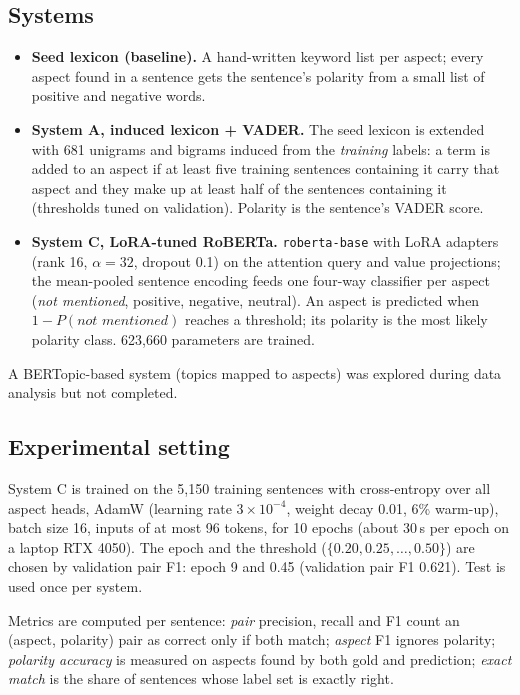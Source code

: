 \documentclass[11pt,a4paper]{article}
\begin{document}
\subsection{Systems}

\begin{itemize}
  \item \textbf{Seed lexicon (baseline).} A hand-written keyword list per aspect; every aspect
    found in a sentence gets the sentence's polarity from a small list of positive and negative
    words.
  \item \textbf{System A, induced lexicon + VADER.} The seed lexicon is extended with 681
    unigrams and bigrams induced from the \emph{training} labels: a term is added to an aspect
    if at least five training sentences containing it carry that aspect and they make up at
    least half of the sentences containing it (thresholds tuned on validation). Polarity is the
    sentence's VADER score.
  \item \textbf{System C, LoRA-tuned RoBERTa.} \texttt{roberta-base} with LoRA adapters
    \citep{hu2022lora} (rank 16, $\alpha=32$, dropout 0.1) on the attention query and value
    projections; the mean-pooled sentence encoding feeds one four-way classifier per aspect
    (\emph{not mentioned}, positive, negative, neutral). An aspect is predicted when
    $1-P(\textit{not mentioned})$ reaches a threshold; its polarity is the most likely polarity
    class. 623,660 parameters are trained.
\end{itemize}

A BERTopic-based system (topics mapped to aspects) was explored during data analysis but not
completed.

\subsection{Experimental setting}

System C is trained on the 5,150 training sentences with cross-entropy over all aspect heads,
AdamW (learning rate $3\times10^{-4}$, weight decay 0.01, 6\% warm-up), batch size 16, inputs of
at most 96 tokens, for 10 epochs (about 30\,s per epoch on a laptop RTX 4050). The epoch and the
threshold ($\{0.20, 0.25, \dots, 0.50\}$) are chosen by validation pair F1: epoch 9 and 0.45
(validation pair F1 0.621). Test is used once per system.

Metrics are computed per sentence: \emph{pair} precision, recall and F1 count an
(aspect, polarity) pair as correct only if both match; \emph{aspect} F1 ignores polarity;
\emph{polarity accuracy} is measured on aspects found by both gold and prediction; \emph{exact
match} is the share of sentences whose label set is exactly right.
\end{document}
